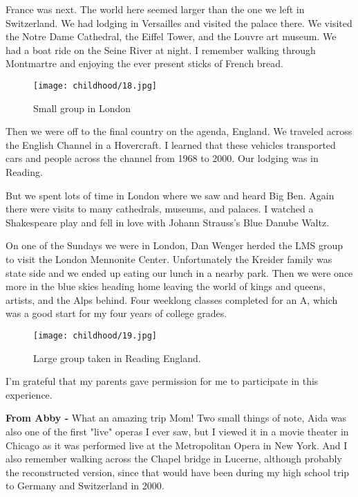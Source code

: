 France was next.
The world here seemed larger than the one we left in Switzerland.
We had lodging in Versailles and visited the palace there.
We visited the Notre Dame Cathedral, the Eiffel Tower, and the Louvre art museum.
We had a boat ride on the Seine River at night.
I remember walking through Montmartre and enjoying the ever present sticks of French bread.

\begin{figure}
\centering
\texttt{[image: childhood/18.jpg]}
\caption{
Small group in London
}
\end{figure}
Then we were off to the final country on the agenda, England.
We traveled across the English Channel in a Hovercraft.
I learned that these vehicles transported cars and people across the channel from 1968 to 2000.
Our lodging was in Reading.

But we spent lots of time in London where we saw and heard Big Ben.
Again there were visits to many cathedrals, museums, and palaces.
I watched a Shakespeare play and fell in love with Johann Strauss's Blue Danube Waltz.

On one of the Sundays we were in London, Dan Wenger herded the LMS group to visit the London Mennonite Center.
Unfortunately the Kreider family was state side and we ended up eating our lunch in a nearby park.
Then we were once more in the blue skies heading home leaving the world of kings and queens, artists, and the Alps behind.
Four weeklong classes completed for an A, which was a good start for my four years of college grades.
\begin{figure}
\centering
\texttt{[image: childhood/19.jpg]}
\caption{
Large group taken in Reading England.
}
\end{figure}
I'm grateful that my parents gave permission for me to participate in this experience.

\textbf{From Abby -} What an amazing trip Mom! Two small things of note, Aida was also one of the first "live" operas I ever saw, but I viewed it in a movie theater in Chicago as it was performed live at the Metropolitan Opera in New York.
And I also remember walking across the Chapel bridge in Lucerne, although probably the reconstructed version, since that would have been during my high school trip to Germany and Switzerland in 2000.
